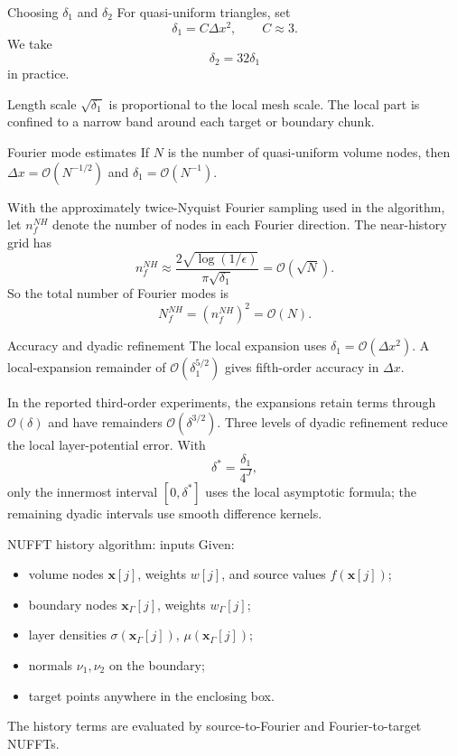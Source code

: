 \documentclass[aspectratio=169,11pt]{beamer}
\newcommand{\cO}{\mathcal{O}}
\newcommand{\x}{\bm{x}}
\begin{document}
\begin{frame}{Choosing $\delta_1$ and $\delta_2$}
\small
For quasi-uniform triangles, set
\[
  \delta_1=C\Delta x^2,
  \qquad C\approx 3.
\]
We take
\[
  \delta_2=32\delta_1
\]
in practice.

\begin{block}{Length scale}
$\sqrt{\delta_1}$ is proportional to the local mesh scale. The local part
is confined to a narrow band around each target or boundary chunk.
\end{block}
\end{frame}

\begin{frame}{Fourier mode estimates}
\small
If $N$ is the number of quasi-uniform volume nodes, then
$\Delta x=\cO(N^{-1/2})$ and $\delta_1=\cO(N^{-1})$.

With the approximately twice-Nyquist Fourier sampling used in the algorithm,
let $n_f^{NH}$ denote the number of nodes in each Fourier direction.  The
near-history grid has
\[
  n_f^{NH}
  \approx
  \frac{2\sqrt{\log(1/\epsilon)}}{\pi\sqrt{\delta_1}}
  =
  \cO(\sqrt N).
\]
So the total number of Fourier modes is
\[
  N_f^{NH}=(n_f^{NH})^2=\cO(N).
\]
\end{frame}

\begin{frame}{Accuracy and dyadic refinement}
\small
The local expansion uses $\delta_1=\cO(\Delta x^2)$.  A local-expansion
remainder of $\cO(\delta_1^{5/2})$ gives fifth-order accuracy in $\Delta x$.

\vspace{1mm}
In the reported third-order experiments, the expansions retain terms through
$\cO(\delta)$ and have remainders $\cO(\delta^{3/2})$.  Three levels of dyadic
refinement reduce the local layer-potential error.  With
\[
  \delta^\ast=\frac{\delta_1}{4^J},
\]
only the innermost interval $[0,\delta^\ast]$ uses the local asymptotic
formula; the remaining dyadic intervals use smooth difference kernels.
\end{frame}

\begin{frame}{NUFFT history algorithm: inputs}
\small
Given:
\begin{itemize}
  \item volume nodes $\x[j]$, weights $w[j]$, and source values $f(\x[j])$;
  \item boundary nodes $\x_\Gamma[j]$, weights $w_\Gamma[j]$;
  \item layer densities $\sigma(\x_\Gamma[j])$, $\mu(\x_\Gamma[j])$;
  \item normals $\nu_1,\nu_2$ on the boundary;
  \item target points anywhere in the enclosing box.
\end{itemize}

The history terms are evaluated by source-to-Fourier and Fourier-to-target NUFFTs.
\end{frame}
\end{document}

